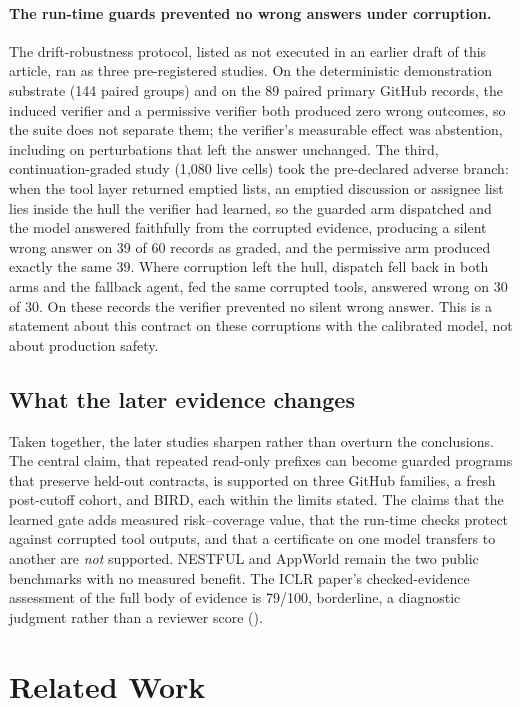 \paragraph{The run-time guards prevented no wrong answers under corruption.}
The drift-robustness protocol, listed as not executed in an earlier draft of this article,
ran as three pre-registered studies. On the deterministic demonstration substrate (144
paired groups) and on the 89 paired primary GitHub records, the induced verifier and a
permissive verifier both produced zero wrong outcomes, so the suite does not separate
them; the verifier's measurable effect was abstention, including on perturbations that
left the answer unchanged. The third, continuation-graded study (1{,}080 live cells) took
the pre-declared adverse branch: when the tool layer returned emptied lists, an
emptied discussion or assignee list lies inside the hull the verifier had learned, so the
guarded arm dispatched and the model answered faithfully from the corrupted evidence,
producing a silent wrong answer on 39 of 60 records as graded, and the permissive arm
produced exactly the same 39. Where corruption left the hull, dispatch fell back in both
arms and the fallback agent, fed the same corrupted tools, answered wrong on 30 of 30. On
these records the verifier prevented no silent wrong answer. This is a statement about this
contract on these corruptions with the calibrated model, not about production safety.

\subsection{What the later evidence changes}

Taken together, the later studies sharpen rather than overturn the conclusions. The
central claim, that repeated read-only prefixes can become guarded programs that preserve
held-out contracts, is supported on three GitHub families, a fresh post-cutoff cohort,
and BIRD, each within the limits stated. The claims that the learned gate adds measured
risk--coverage value, that the run-time checks protect against corrupted tool outputs, and
that a certificate on one model transfers to another are \emph{not} supported. NESTFUL and
AppWorld remain the two public benchmarks with no measured benefit. The ICLR paper's
checked-evidence assessment of the full body of evidence is 79/100, borderline, a
diagnostic judgment rather than a reviewer score
().

\section{Related Work}
\label{sec:related}

